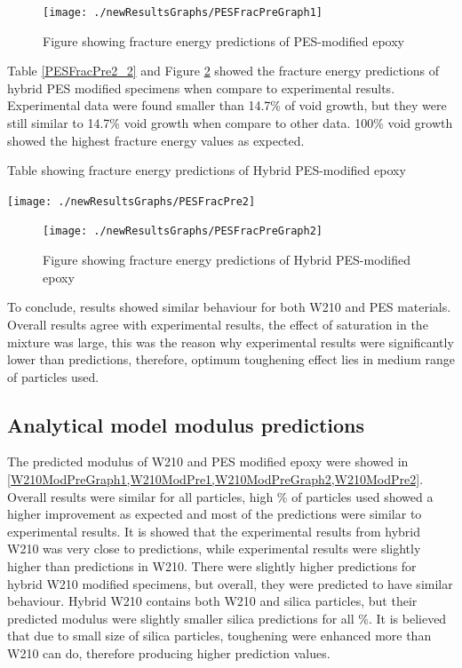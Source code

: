 \documentclass[numbers=noendperiod,chapterprefix=on]{icldt} %
\begin{document}
{\begin{figure}[!hp]
\centering
\texttt{[image: ./newResultsGraphs/PESFracPreGraph1]}
\caption{Figure showing fracture energy predictions of PES-modified epoxy}
\label{PESFracPre2}
\end{figure}
\FloatBarrier
Table \ref{PESFracPre2_2} and Figure \ref{PESFracPreGraph2} showed the fracture energy predictions of hybrid PES modified specimens when compare to experimental results. Experimental data were found smaller than 14.7\% of void growth, but they were still similar to 14.7\% void growth when compare to other data. 100\% void growth showed the highest fracture energy values as expected.

\begin{table}[!htpb]
\centering
\caption{Table showing fracture energy predictions of Hybrid PES-modified epoxy} \label{PESFracPre2_2}
\texttt{[image: ./newResultsGraphs/PESFracPre2]}
\end{table}
\FloatBarrier
\begin{figure}[!btp]
\centering
\texttt{[image: ./newResultsGraphs/PESFracPreGraph2]}
\label{PESFracPreGraph2}
\caption{Figure showing fracture energy predictions of Hybrid PES-modified epoxy}
\end{figure}

To conclude, results showed similar behaviour for both W210 and PES materials. Overall results agree with experimental results, the effect of saturation in the mixture was large, this was the reason why experimental results were significantly lower than predictions, therefore, optimum toughening effect lies in medium range of particles used. 

\subsection{Analytical model modulus predictions}
The predicted modulus of W210 and PES modified epoxy were showed in \ref{W210ModPreGraph1,W210ModPre1,W210ModPreGraph2,W210ModPre2}. Overall results were similar for all particles, high \% of particles used showed a higher improvement as expected and most of the predictions were similar to experimental results. 
It is showed that the experimental results from hybrid W210 was very close to predictions, while experimental results were slightly higher than predictions in W210. There were slightly higher predictions for hybrid W210 modified specimens, but overall, they were predicted to have similar behaviour. Hybrid W210 contains both W210 and silica particles, but their predicted modulus were slightly smaller silica predictions for all \%. It is believed that due to small size of silica particles, toughening were enhanced more than W210 can do, therefore producing higher prediction values.

}
\end{document}
